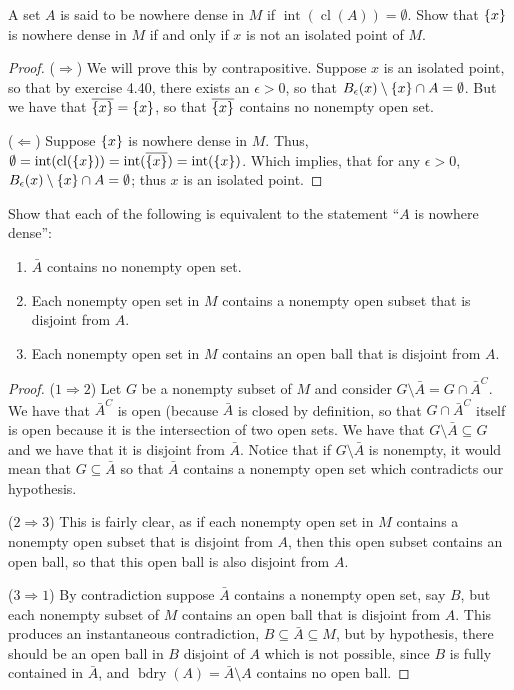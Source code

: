 \begin{exercise}{54}
A set $A$ is said to be nowhere dense in $M$ if $\operatorname{int}(\operatorname{cl}(A)) = \emptyset$.
Show that $\{x\}$ is nowhere dense in $M$ if and only if $x$ is not an isolated point of $M$.
\end{exercise}
\begin{proof}
($\Rightarrow$)
We will prove this by contrapositive.
Suppose $x$ is an isolated point, so that by exercise 4.40, there exists an $\epsilon >0$, so that $B_\epsilon(x)\setminus \{x\} \cap A = \emptyset$.
But we have that $\overline{\{x\}} = \{x\}$, so that $\overline{\{x\}}$ contains no nonempty open set.

($\Leftarrow$)
Suppose $\{x\}$ is nowhere dense in $M$.
Thus, $\emptyset = \operatorname{int}(\operatorname{cl}(\{x\})) = \operatorname{int}(\overline{\{x\}}) = \operatorname{int}(\{x\})$.
Which implies, that for any $\epsilon>0$, $B_\epsilon(x) \setminus \{x\} \cap A =\emptyset$;
thus $x$ is an isolated point.
\end{proof} 

\begin{exercise}{60}
Show that each of the following is equivalent to the statement ``$A$ is nowhere dense'':
\begin{enumerate}
    \item $\bar{A}$ contains no nonempty open set.
    \item Each nonempty open set in $M$ contains a nonempty open subset that is disjoint from $A$.
    \item Each nonempty open set in $M$ contains an open ball that is disjoint from $A$.
\end{enumerate}
\end{exercise}
\begin{proof}
($1 \Rightarrow 2$)
Let $G$ be a nonempty subset of $M$ and consider $G \setminus \bar{A} = G \cap \bar{A}^C$.
We have that $\bar{A}^C$ is open (because $\bar{A}$ is closed by definition, so that $G \cap \bar{A}^C$ itself is open because it is the intersection of two open sets.
We have that $G \setminus \bar{A} \subseteq G$ and we have that it is disjoint from $\bar{A}$.
Notice that if $G\setminus \bar{A}$ is nonempty, it would mean that $G\subseteq \bar{A}$ so that $\bar{A}$ contains a nonempty open set which contradicts our hypothesis.

($2 \Rightarrow 3$)
This is fairly clear, as if each nonempty open set in $M$ contains a nonempty open subset that is disjoint from $A$, then this open subset contains an open ball, so that this open ball is also disjoint from $A$.

($3 \Rightarrow 1$)
By contradiction suppose $\bar{A}$ contains a nonempty open set, say $B$, but each nonempty subset of $M$ contains an open ball that is disjoint from $A$. 
This produces an instantaneous contradiction, $B \subseteq \bar{A} \subseteq M$, but by hypothesis, there should be an open ball in $B$ disjoint of $A$ which is not possible, since $B$ is fully contained in $\bar{A}$, and $\operatorname{bdry}(A) = \bar{A}\setminus A$ contains no open ball.
\end{proof} 